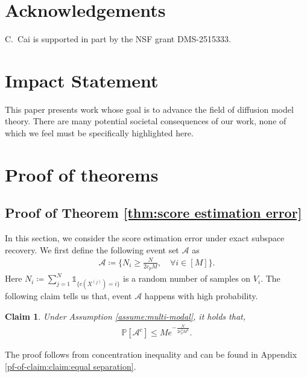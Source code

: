 \documentclass{article}
\newcommand{\ind}{\mathds{1}}
\newcommand{\defn}{\coloneqq}
\newcommand{\bP}{\mathbb{P}}
\theoremstyle{plain}
\newtheorem{claim}{\bf Claim}
\theoremstyle{remark}
\begin{document}
\section*{Acknowledgements}
C.\ Cai is supported in part by the NSF grant DMS-2515333.

\section*{Impact Statement}
This paper presents work whose goal is to advance the field of diffusion model theory. There are many potential societal consequences of our work, none of which we feel must be specifically highlighted here.





\appendix
\onecolumn
\section{Proof of theorems}

\subsection{Proof of Theorem \ref{thm:score estimation error}}
\label{pf-of-thm:thm:score estimation error}
In this section, we consider the score estimation error under exact subspace recovery. 
We first define the following event set $\mathcal{A}$ as
\begin{align*}
    \mathcal{A} \defn \Big\{ N_i \geq \frac{N}{2c_{p}M}, \quad \forall i \in [M] \Big\}.
\end{align*}
Here $N_i\defn \sum_{j=1}^N \ind_{\{ c(X^{(j)}) = i\}}$ is a random number of samples on $V_i$. 
The following claim tells us that, event $\mathcal{A}$ happens with high probability.
\begin{claim}
    \label{claim:equal separation}
    Under Assumption \ref{assume:multi-modal}, it holds that,
    \begin{align*}
       \bP[\mathcal{A}^c] \leq Me^{-\frac{N}{2c_{p}^2M^2}}.
    \end{align*}
\end{claim}
The proof follows from concentration inequality and can be found in Appendix \ref{pf-of-claim:claim:equal separation}.
\end{document}

